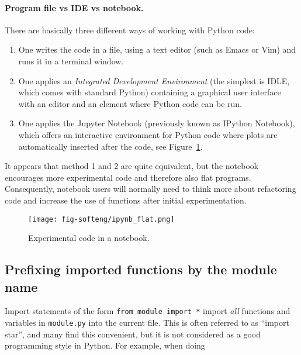 \documentclass[graybox,sectrefs,envcountresetchap,open=right,final]{svmonodo}
\begin{document}
\paragraph{Program file vs IDE vs notebook.}
There are basically three different ways of working with Python code:

\begin{enumerate}
\item One writes the code in a file, using a text editor (such as Emacs or Vim) and runs it in a terminal window.

\item One applies an \emph{Integrated Development Environment} (the simplest is IDLE, which comes with standard Python) containing a graphical user interface with an editor and an element where Python code can be run.

\item One applies the Jupyter Notebook (previously known as IPython Notebook), which offers an interactive environment for Python code where plots are automatically inserted after the code, see Figure~\ref{softeng1:ipynb}.
\end{enumerate}

\noindent
It appears that method 1 and 2 are quite equivalent, but the notebook
encourages more experimental code and therefore also flat programs.
Consequently, notebook users will normally need to think more about
refactoring code and increase the use of functions after initial
experimentation.

\begin{figure}[!ht]  %
  \centerline{\texttt{[image: fig-softeng/ipynb\_flat.png]}}
  \caption{
  Experimental code in a notebook. \label{softeng1:ipynb}
  }
\end{figure}

\subsection{Prefixing imported functions by the module name}
\label{softeng1:basic:modprefix}


Import statements of the form \texttt{from module import *} import
\emph{all} functions and variables in \texttt{module.py} into the current file.
This is often referred to as ``import star'', and
many find this convenient, but it is not considered as a good
programming style in Python.
For example, when doing
\end{document}
